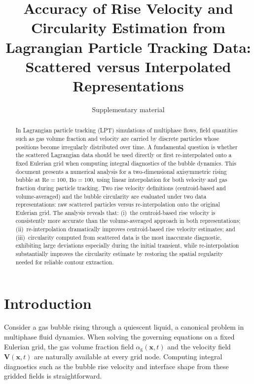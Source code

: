 \documentclass[11pt,a4paper]{article}
\title{%
  Accuracy of Rise Velocity and Circularity Estimation from Lagrangian
  Particle Tracking Data: \\[4pt]
  Scattered versus Interpolated Representations}
\author{Supplementary material}
\date{}
\newcommand{\alphag}{\alpha_{\mathrm{g}}}
\begin{document}
\maketitle

\begin{abstract}
In Lagrangian particle tracking (LPT) simulations of multiphase flows, field
quantities such as gas volume fraction and velocity are carried by discrete
particles whose positions become irregularly distributed over time.  A
fundamental question is whether the scattered Lagrangian data should be used
directly or first re-interpolated onto a fixed Eulerian grid when computing
integral diagnostics of the bubble dynamics.  This document presents a
numerical analysis for a two-dimensional axisymmetric rising bubble at
$\mathrm{Re}=100$, $\mathrm{Bo}=100$, using linear interpolation for both
velocity and gas fraction during particle tracking.  Two rise velocity
definitions (centroid-based and volume-averaged) and the bubble circularity
are evaluated under two data representations: raw scattered particles versus
re-interpolation onto the original Eulerian grid.  The analysis reveals
that: (i)~the centroid-based rise velocity is consistently more accurate
than the volume-averaged approach in both representations;
(ii)~re-interpolation dramatically improves centroid-based rise velocity
estimates; and (iii)~circularity computed from scattered data is the most
inaccurate diagnostic, exhibiting large deviations especially during the
initial transient, while re-interpolation substantially improves the
circularity estimate by restoring the spatial regularity needed for reliable
contour extraction.
\end{abstract}

\section{Introduction}\label{sec:intro}

Consider a gas bubble rising through a quiescent liquid, a canonical problem
in multiphase fluid dynamics.  When solving the governing equations on a
fixed Eulerian grid, the gas volume fraction field
$\alphag(\bm{x},t)$ and the velocity field $\bm{V}(\bm{x},t)$ are
naturally available at every grid node.  Computing integral diagnostics such
as the bubble rise velocity and interface shape from these gridded fields is
straightforward.
\end{document}

